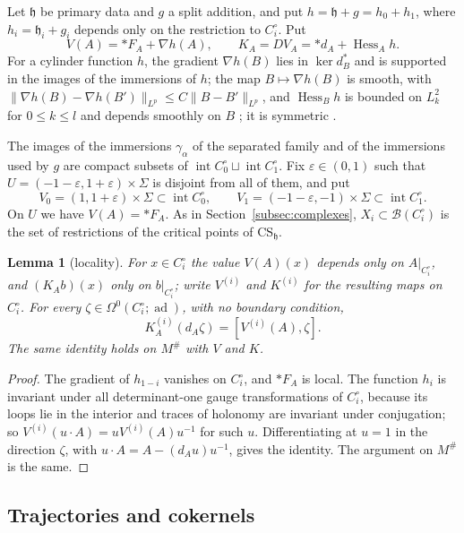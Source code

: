 \documentclass[11pt]{amsart}
\newtheorem{lemma}[theorem]{Lemma}
\theoremstyle{definition}
\theoremstyle{remark}
\theoremstyle{plain}
\numberwithin{equation}{section}
\newcommand{\cB}{\mathcal{B}}
\newcommand{\ad}{\operatorname{ad}}
\newcommand{\eps}{\varepsilon}
\begin{document}
Let $\mathfrak h$ be primary data and $g$ a split addition, and put $h=\mathfrak h+g=h_0+h_1$,
where $h_i=\mathfrak h_i+g_i$ depends only on the restriction to $C_i^\circ$. Put
\[
V(A)=*F_A+\nabla h(A),\qquad K_A=DV_A=*d_A+\operatorname{Hess}_Ah .
\]
For a cylinder function $h$, the gradient $\nabla h(B)$ lies in $\ker d_B^*$ and is supported in
the images of the immersions of $h$; the map $B\mapsto\nabla h(B)$ is smooth, with
$\|\nabla h(B)-\nabla h(B')\|_{L^p}\le C\|B-B'\|_{L^p}$, and $\operatorname{Hess}_Bh$ is bounded on
$L^2_k$ for $0\le k\le l$ and depends smoothly on $B$ \cite[Proposition~6.1]{DFL}; it is
symmetric \cite[Lemma~2.13]{DFL}.

The images of the immersions $\gamma_\alpha$ of the separated family and of the immersions
used by $g$ are compact subsets of
$\operatorname{int}C_0^\circ\sqcup\operatorname{int}C_1^\circ$. Fix $\eps\in(0,1)$ such that
$U=(-1-\eps,1+\eps)\times\Sigma$ is disjoint from all of them, and put
\[
V_0=(1,1+\eps)\times\Sigma\subset\operatorname{int}C_0^\circ,\qquad
V_1=(-1-\eps,-1)\times\Sigma\subset\operatorname{int}C_1^\circ .
\]
On $U$ we have $V(A)=*F_A$. As in Section~\ref{subsec:complexes}, $X_i\subset\cB(C_i^\circ)$ is the
set of restrictions of the critical points of $\mathrm{CS}_{\mathfrak h}$.

\begin{lemma}[locality]\label{lem:app-locality}
For $x\in C_i^\circ$ the value $V(A)(x)$ depends only on $A|_{C_i^\circ}$, and $(K_Ab)(x)$ only
on $b|_{C_i^\circ}$; write $V^{(i)}$ and $K^{(i)}$ for the resulting maps on $C_i^\circ$. For every
$\zeta\in\Omega^0(C_i^\circ;\ad)$, with no boundary condition,
\[
K^{(i)}_A(d_A\zeta)=[V^{(i)}(A),\zeta].
\]
The same identity holds on $M^\#$ with $V$ and $K$.
\end{lemma}

\begin{proof}
The gradient of $h_{1-i}$ vanishes on $C_i^\circ$, and $*F_A$ is local. The function $h_i$ is
invariant under all determinant-one gauge transformations of $C_i^\circ$, because its loops lie
in the interior and traces of holonomy are invariant under conjugation; so
$V^{(i)}(u\cdot A)=uV^{(i)}(A)u^{-1}$ for such $u$. Differentiating at $u=1$ in the direction
$\zeta$, with $u\cdot A=A-(d_Au)u^{-1}$, gives the identity. The argument on $M^\#$ is the same.
\end{proof}

\subsection{Trajectories and cokernels}
\end{document}
